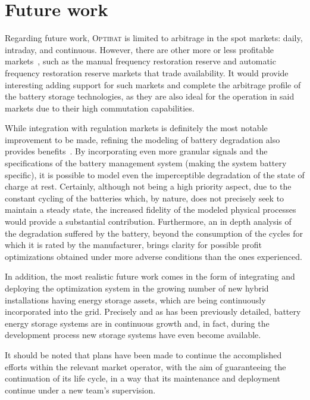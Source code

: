 \section*{Future work}

Regarding future work, \textsc{Optibat} is limited to arbitrage in the spot markets: daily, intraday, and continuous. However, there are other more or less profitable markets~\cite{cnmc2024balance}, such as the manual frequency restoration reserve and automatic frequency restoration reserve markets that trade availability. It would provide interesting adding support for such markets and complete the arbitrage profile of the battery storage technologies, as they are also ideal for the operation in said markets due to their high commutation capabilities.

While integration with regulation markets is definitely the most notable improvement to be made, refining the modeling of battery degradation also provides benefits~\cite{shamarova2022review}. By incorporating even more granular signals and the specifications of the battery management system (making the system battery specific), it is possible to model even the imperceptible degradation of the state of charge at rest. Certainly, although not being a high priority aspect, due to the constant cycling of the batteries which, by nature, does not precisely seek to maintain a steady state, the increased fidelity of the modeled physical processes would provide a substantial contribution. Furthermore, an in depth analysis of the degradation suffered by the battery, beyond the consumption of the cycles for which it is rated by the manufacturer, brings clarity for possible profit optimizations obtained under more adverse conditions than the ones experienced.

In addition, the most realistic future work comes in the form of integrating and deploying the optimization system in the growing number of new hybrid installations having energy storage assets, which are being continuously incorporated into the grid. Precisely and as has been previously detailed, battery energy storage systems are in continuous growth and, in fact, during the development process new storage systems have even become available.

It should be noted that plans have been made to continue the accomplished efforts within the relevant market operator, with the aim of guaranteeing the continuation of its life cycle, in a way that its maintenance and deployment continue under a new team's supervision.
